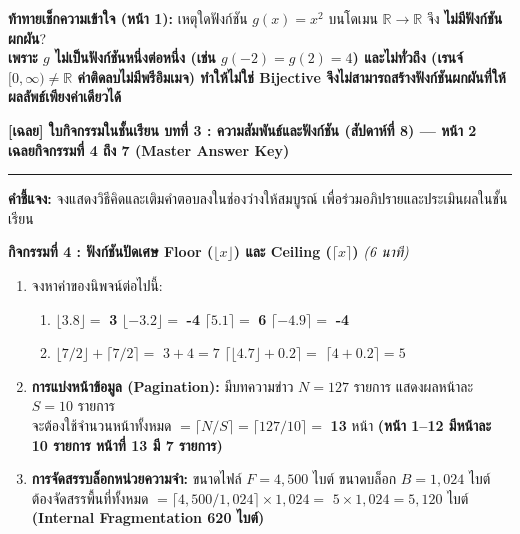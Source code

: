 \documentclass[a4paper,12pt]{article}
\newcommand{\ans}[1]{\textbf{\color{ans}#1}}
\begin{document}
\noindent\textbf{ท้าทายเช็กความเข้าใจ (หน้า 1):} เหตุใดฟังก์ชัน $g(x) = x^2$ บนโดเมน $\mathbb{R} \to \mathbb{R}$ จึง \textbf{ไม่มีฟังก์ชันผกผัน}? \\[0.15em]
\ans{เพราะ $g$ ไม่เป็นฟังก์ชันหนึ่งต่อหนึ่ง (เช่น $g(-2) = g(2) = 4$) และไม่ทั่วถึง (เรนจ์ $[0, \infty) \neq \mathbb{R}$ ค่าติดลบไม่มีพรีอิมเมจ) ทำให้ไม่ใช่ Bijective จึงไม่สามารถสร้างฟังก์ชันผกผันที่ให้ผลลัพธ์เพียงค่าเดียวได้}

\clearpage
\noindent
\begin{minipage}[c]{\textwidth}
  {\large\bfseries\color{navy} [เฉลย] ใบกิจกรรมในชั้นเรียน บทที่ 3 : ความสัมพันธ์และฟังก์ชัน (สัปดาห์ที่ 8) --- หน้า 2}\\[0.25em]
  {\bfseries\color{ans} เฉลยกิจกรรมที่ 4 ถึง 7 (Master Answer Key)}
\end{minipage}
\par\vspace{0.3em}\hrule\vspace{0.4em}

\noindent\textbf{คำชี้แจง:} จงแสดงวิธีคิดและเติมคำตอบลงในช่องว่างให้สมบูรณ์ เพื่อร่วมอภิปรายและประเมินผลในชั้นเรียน
\vspace{0.3em}

\noindent\textbf{กิจกรรมที่ 4 : ฟังก์ชันปัดเศษ Floor ($\lfloor x \rfloor$) และ Ceiling ($\lceil x \rceil$)} \hfill \textit{(6 นาที)}
\begin{enumerate}[label=\arabic*)]
  \item จงหาค่าของนิพจน์ต่อไปนี้:
        \begin{enumerate}[label=(\alph*),itemsep=1pt]
          \item $\lfloor 3.8 \rfloor =$ \ans{3} \quad $\lfloor -3.2 \rfloor =$ \ans{-4} \quad $\lceil 5.1 \rceil =$ \ans{6} \quad $\lceil -4.9 \rceil =$ \ans{-4}
          \item $\lfloor 7/2 \rfloor + \lceil 7/2 \rceil =$ \ans{$3 + 4 = 7$} \quad $\lceil \lfloor 4.7 \rfloor + 0.2 \rceil =$ \ans{$\lceil 4 + 0.2 \rceil = 5$}
        \end{enumerate}
  \item \textbf{การแบ่งหน้าข้อมูล (Pagination):} มีบทความข่าว $N = 127$ รายการ แสดงผลหน้าละ $S = 10$ รายการ\\
        จะต้องใช้จำนวนหน้าทั้งหมด $= \lceil N / S \rceil = \lceil 127 / 10 \rceil =$ \ans{13} หน้า \ans{(หน้า 1--12 มีหน้าละ 10 รายการ หน้าที่ 13 มี 7 รายการ)}
  \item \textbf{การจัดสรรบล็อกหน่วยความจำ:} ขนาดไฟล์ $F = 4,500$ ไบต์ ขนาดบล็อก $B = 1,024$ ไบต์\\
        ต้องจัดสรรพื้นที่ทั้งหมด $= \lceil 4,500 / 1,024 \rceil \times 1,024 =$ \ans{$5 \times 1,024 = 5,120$} ไบต์ \ans{(Internal Fragmentation 620 ไบต์)}
\end{enumerate}
\vspace{0.2em}
\end{document}
